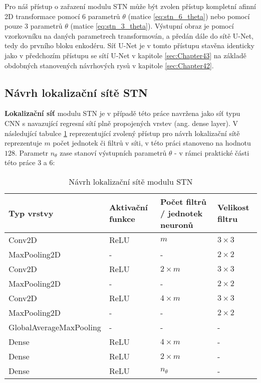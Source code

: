Pro náš přístup o zařazení modulu STN může být zvolen přístup kompletní afinní 2D transformace pomocí 6 parametrů $\theta$ (matice \ref{eq:stn_6_theta}) nebo pomocí pouze 3 parametrů $\theta$ (matice \ref{eq:stn_3_theta}). Výstupní obraz je pomocí vzorkovníku na daných parametrech transformován, a předán dále do sítě U-Net, tedy do prvního bloku enkodéru. Síť U-Net je v tomto přístupu stavěna identicky jako v předchozím přístupu se sítí U-Net v kapitole \ref{sec:Chapter43} na základě obdobných stanovených návrhových rysů v kapitole \ref{sec:Chapter42}.

\subsection{Návrh lokalizační sítě STN}

\textbf{Lokalizační síť} modulu STN je v případě této práce navržena jako síť typu CNN s navazující regresní sítí plně propojených vrstev (ang. dense layer). V následující tabulce \ref{fig:stn_loc_net} reprezentující zvolený přístup pro návrh lokalizační sítě reprezentuje $m$ počet jednotek či filtrů v síti, v této práci stanoveno na hodnotu $128$. Parametr $n_{\theta}$ zase stanoví výstupních parametrů $\theta$ - v rámci praktické části této práce $3$ a $6$:

\begin{table}[H]
\centering
\begin{tabular}{@{}llll@{}}
\toprule
Typ vrstvy & Aktivační funkce & Počet filtrů / jednotek neuronů & Velikost filtru \\ \midrule
Conv2D & ReLU & $m$ & $3 \times 3$ \\
MaxPooling2D & - & - & $2 \times 2$ \\
Conv2D & ReLU & $2\times m$ & $3 \times 3$ \\
MaxPooling2D & - & - & $2 \times 2$ \\
Conv2D & ReLU & $4\times m$ & $3 \times 3$ \\
MaxPooling2D & - & - & $2 \times 2$ \\
GlobalAverageMaxPooling & - & - & - \\
\bottomrule
Dense & ReLU & $4\times m$ & - \\
Dense & ReLU & $2\times m$ & - \\
Dense & ReLU & $n_{\theta}$ & - \\
\bottomrule
\end{tabular}
\caption[Návrh lokalizační sítě modulu STN] { Návrh lokalizační sítě modulu STN }
\label{fig:stn_loc_net}
\end{table}

